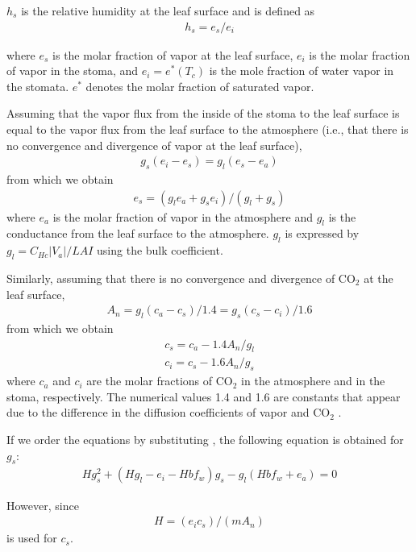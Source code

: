 \(h_s\) is the relative humidity at the leaf surface and is defined as \begin{eqnarray}
 h_s = e_s / e_i \label{eq94}
\end{eqnarray}

where \(e_s\) is the molar fraction of vapor at the leaf surface, \(e_i\) is the molar fraction of vapor in the stoma, and \(e_i = e^* (T_c)\) is the mole fraction of water vapor in the stomata.
\(e^*\) denotes the molar fraction of saturated vapor.

Assuming that the vapor flux from the inside of the stoma to the leaf surface is equal to the vapor flux from the leaf surface to the atmosphere (i.e., that there is no convergence and divergence of
vapor at the leaf surface), \begin{eqnarray}
 g_s(e_i - e_s) = g_l(e_s - e_a) \label{eq95}
\end{eqnarray} from which we obtain \begin{eqnarray}
 e_s = ( g_l e_a + g_s e_i ) / ( g_l + g_s )\label{eq96}
\end{eqnarray} where \(e_a\) is the molar fraction of vapor in the atmosphere and \(g_l\) is the conductance from the leaf surface to the atmosphere. \(g_l\) is expressed by \(g_l = C_{Hc}|V_a| /
LAI\) using the bulk coefficient.

Similarly, assuming that there is no convergence and divergence of \(\mathrm{CO_2}\) at the leaf surface, \begin{eqnarray}
 A_n = g_l(c_a - c_s)/1.4
     = g_s(c_s - c_i)/1.6
\end{eqnarray} from which we obtain \begin{eqnarray}
 c_s = c_a - 1.4 A_n/g_l \\
 c_i = c_s - 1.6 A_n/g_s \label{eq99}
\end{eqnarray} where \(c_a\) and \(c_i\) are the molar fractions of \(\mathrm{CO_2}\) in the atmosphere and in the stoma, respectively. The numerical values 1.4 and 1.6 are constants that appear due to the
difference in the diffusion coefficients of vapor and \(\mathrm{CO_2}\) .

If we order the equations by substituting \hyperref[eq93]{}, the following equation is obtained for \(g_s\): \begin{eqnarray}
 H g_s^2 + ( H g_l - e_i - H b f_w ) g_s - g_l ( H b f_w + e_a ) = 0 \label{eq100}
\end{eqnarray}

However, since \begin{eqnarray}
 H = (e_i c_s)/(m A_n)
\end{eqnarray} \hyperref[eq99]{} is used for \(c_s\).

